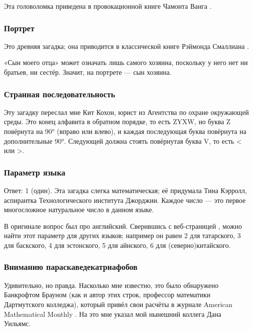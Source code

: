 Эта головоломка приведена в провокационной книге Чамонта Ванга \cite{58}.

\subsubsection*{Портрет}

Это древняя загадка;
она приводится в классической книге Рэймонда Смаллиана \cite{55}.

«Сын моего отца» может означать лишь самого хозяина, поскольку у него нет ни братьев, ни сестёр.
Значит, на портрете — сын хозяина.

\subsubsection*{Странная последовательность}

Эту загадку переслал мне Кит Кохон, юрист из Агентства по охране окружающей среды.
Это конец алфавита в обратном порядке, то есть ZYXW, но буква Z повёрнута на 90° (вправо или влево), и каждая последующая буква повёрнута на дополнительные 90°.
Следующей должна стоять повёрнутая буква V, то есть < или >.

\subsubsection*{Параметр языка}

Ответ: 1 (один).
Эта загадка слегка математическая;
её придумала Тина Кэрролл, аспирантка Технологического института Джорджии. 
Каждое число — это первое многосложное натуральное число в данном языке.

\begin{addedbytheeditors}
В оригинале вопрос был про английский.
Сверившись с веб-страницей \cite{numerals}, можно найти этот параметр для других языков;
например он равен 2 для татарского, 3 для баскского, 4 для эстонского, 5 для айнского, 6 для (северно)китайского. \pr
\end{addedbytheeditors}


\subsubsection*{Вниманию параскаведекатриафобов}

Удивительно, но правда.
Насколько мне известно, это было обнаружено Банкрофтом Брауном (как и автор этих строк, профессор математики Дартмутского колледжа), который привёл свои расчёты в журнале American Mathematical Monthly \cite{11}.
На это мне указал мой нынешний коллега Дана Уильямс.


